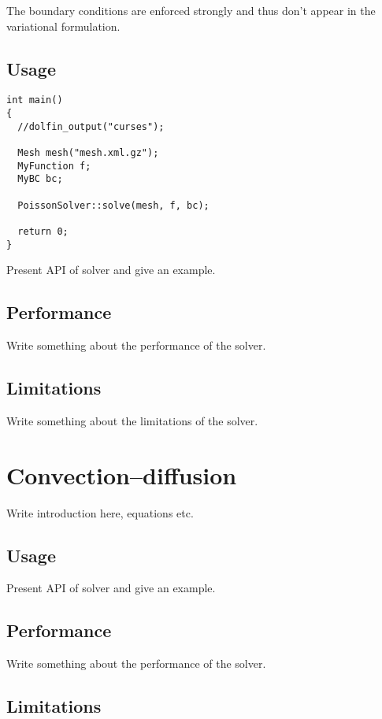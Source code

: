 The boundary conditions are enforced strongly and thus don't appear in
the variational formulation.

\subsection{Usage}

\begin{verbatim}
int main()
{
  //dolfin_output("curses");

  Mesh mesh("mesh.xml.gz");
  MyFunction f;
  MyBC bc;
  
  PoissonSolver::solve(mesh, f, bc);
  
  return 0;
}
\end{verbatim}

Present API of solver and give an example.

\subsection{Performance}

Write something about the performance of the solver.

\subsection{Limitations}

Write something about the limitations of the solver.

\section{Convection--diffusion}

Write introduction here, equations etc.

\subsection{Usage}

Present API of solver and give an example.

\subsection{Performance}

Write something about the performance of the solver.

\subsection{Limitations}


